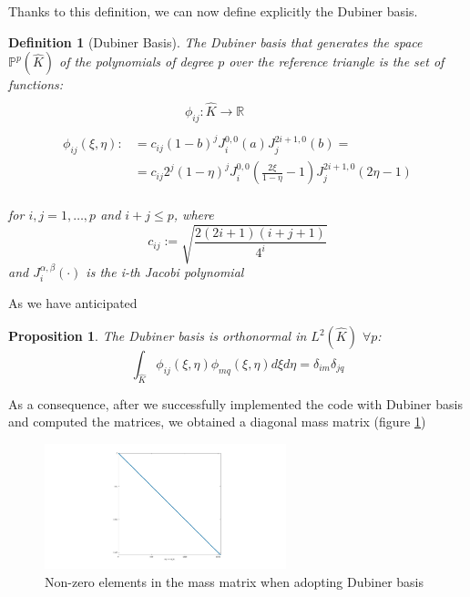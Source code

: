 \documentclass[a4paper,11pt]{article}
\newtheorem{definition}{Definition}
\newtheorem{prop}{Proposition}
\begin{document}
    \noindent Thanks to this definition, we can now define explicitly the Dubiner basis.
    \begin{definition}[Dubiner Basis] \label{dubiner}
    The Dubiner basis that generates the space $\mathbb{P}^p(\hat{K})$ of the polynomials of degree $p$ over the reference triangle is the set of functions:
    \begin{equation}
    \begin{split}
    \\
    & \quad \quad\quad  \quad \phi_{ij}: \hat{K} \rightarrow \mathbb{R} \\ \\
    \phi_{ij}(\xi,\eta) :&= c_{ij}(1-b)^j J_i^{0,0}(a) J_j^{2i+1,0}(b)=
    \\&=c_{ij} 2^j (1-\eta)^j J_i^{0,0}(\frac{2\xi}{1-\eta}-1) J_j^{2i+1,0} (2\eta-1) 
    \end{split}
    \end{equation}
    \vspace{3mm} \\
    for $i,j=1,\dots,p$ and $i+j \le p$, where
    \begin{equation}
    c_{ij} := \sqrt{\frac{2(2i+1)(i+j+1)}{4^i}}
    \end{equation}
    and $J_i^{\alpha,\beta}(\cdot)$ is the i-th Jacobi polynomial
    \end{definition}
    
    \vspace{5mm}
    \noindent As we have anticipated \cite{sherwin}
    \begin{prop}\label{l2_ortho}
    The Dubiner basis is orthonormal in $L^2(\hat{K})$ $\forall p$:
    \begin{equation}
    \int_{\hat{K}}{\phi_{ij}(\xi,\eta)\phi_{mq}(\xi,\eta) d\xi d\eta}=\delta_{im}\delta_{jq}
    \end{equation}
    \end{prop}
    \vspace{4mm}
    \noindent As a consequence, after we successfully implemented the code with Dubiner basis and computed the matrices, we obtained a diagonal mass matrix (figure \ref{mass})
    
    \begin{figure}[ht]
    \begin{center}
    \includegraphics[width = 7cm]{./mass_dubiner.jpg}
    	\caption{Non-zero elements in the mass matrix when adopting Dubiner basis}
    	\label{mass}
    \end{center}
    \end{figure}
\end{document}
